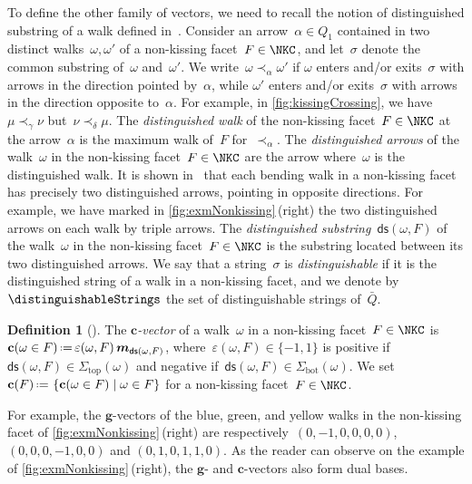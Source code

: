 \documentclass{amsart}
\theoremstyle{definition}
\newtheorem{definition}[theorem]{Definition}
\renewcommand{\b}[1]{{\boldsymbol{#1}}} %
\newcommand{\set}[2]{\left\{ #1 \;\middle|\; #2 \right\}} %
\newcommand{\eqdef}{\mbox{\,\raisebox{0.2ex}{\scriptsize\ensuremath{\mathrm:}}\ensuremath{=}\,}} %
\newcommand{\darkblue}{\color{darkblue}} %
\newcommand{\defn}[1]{\textsl{\darkblue #1}} %
\newcommand{\multiplicityVector}{\b{m}} %
\newcommand{\cvector}[2]{\mathbf{c}(#2 \in #1)} %
\newcommand{\cvectors}[1]{\mathbf{c}(#1)} %
\newcommand{\quiver}{\bar Q} %
\renewcommand{\top}{\mathrm{top}} %
\newcommand{\bottom}{\mathrm{bot}} %
\newcommand{\distinguishedString}[2]{\mathsf{ds}(#1,#2)} %
\newcommand{\distinguishedSign}[2]{\varepsilon(#1,#2)} %
\begin{document}
To define the other family of vectors, we need to recall the notion of distinguished substring of a walk defined in~\cite[Def.~2.25]{PaluPilaudPlamondon-nonkissing}.
Consider an arrow~$\alpha \in Q_1$ contained in two distinct walks~$\omega, \omega'$ of a non-kissing facet~$F \in \NKC$, and let~$\sigma$ denote the common substring of~$\omega$ and~$\omega'$.
We write~$\omega \prec_\alpha \omega'$ if $\omega$ enters and/or exits~$\sigma$ with arrows in the direction pointed by~$\alpha$, while $\omega'$ enters and/or exits~$\sigma$ with arrows in the direction opposite to~$\alpha$.
For example, in \cref{fig:kissingCrossing}, we have~$\mu \prec_\gamma \nu$ but~$\nu \prec_\delta \mu$.
The \defn{distinguished walk} of the non-kissing facet~$F \in \NKC$ at the arrow~$\alpha$ is the maximum walk of~$F$ for~$\prec_\alpha$.
The \defn{distinguished arrows} of the walk~$\omega$ in the non-kissing facet~$F \in \NKC$ are the arrow where~$\omega$ is the distinguished walk.
It is shown in~\cite[Prop.~2.28]{PaluPilaudPlamondon-nonkissing} that each bending walk in a non-kissing facet has precisely two distinguished arrows, pointing in opposite directions.
For example, we have marked in \cref{fig:exmNonkissing}\,(right) the two distinguished arrows on each walk by triple arrows.
The \defn{distinguished substring}~$\distinguishedString{\omega}{F}$ of the walk~$\omega$ in the non-kissing facet~$F \in \NKC$ is the substring located between its two distinguished arrows.
We say that a string~$\sigma$ is \defn{distinguishable} if it is the distinguished string of a walk in a non-kissing facet, and we denote by~$\distinguishableStrings$ the set of distinguishable strings of~$\quiver$.

\begin{definition}[{\cite[Def.~{4.11}]{PaluPilaudPlamondon-nonkissing}}]
The \defn{$\b{c}$-vector} of a walk~$\omega$ in a non-kissing facet~${F \in \NKC}$ is~${\cvector{F}{\omega} \eqdef \distinguishedSign{\omega}{F} \, \multiplicityVector_{\distinguishedString{\omega}{F}}}$, where~$\distinguishedSign{\omega}{F} \in \{-1,1\}$ is positive if~${\distinguishedString{\omega}{F} \in \Sigma_\top(\omega)}$ and negative if~${\distinguishedString{\omega}{F} \in \Sigma_\bottom(\omega)}$.
We set~$\cvectors{F} \eqdef \set{\cvector{F}{\omega}}{\omega \in F}$ for a non-kissing facet~$F \in \NKC$.
\end{definition}

For example, the $\b{g}$-vectors of the blue, green, and yellow walks in the non-kissing facet of \cref{fig:exmNonkissing}\,(right) are respectively~$(0, -1, 0, 0, 0, 0)$, $(0, 0, 0, -1, 0, 0)$ and $(0, 1, 0, 1, 1, 0)$.
As the reader can observe on the example of \cref{fig:exmNonkissing}\,(right), the $\b{g}$- and $\b{c}$-vectors also form dual bases.
\end{document}

